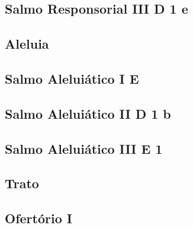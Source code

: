 \subsection[Salmo Responsorial III]{Salmo Responsorial III \textmd{D 1 e}}\label{subsection:liturgia-defunctorum/missa-pro-defunctis/psalmus-responsorius-3}

\subsection{Aleluia}\label{subsection:liturgia-defunctorum/missa-pro-defunctis/alleluia}
\def\AntiphonScore{alleluia.4E.2/}

\subsection[Salmo Aleluiático I]{Salmo Aleluiático I \textmd{E \protect\GreStar}}\label{subsection:liturgia-defunctorum/missa-pro-defunctis/psalmus-alleluiaticus-1}

\AllowPageFlush

\subsection[Salmo Aleluiático II]{Salmo Aleluiático II \textmd{D 1 b}}\label{subsection:liturgia-defunctorum/missa-pro-defunctis/psalmus-alleluiaticus-2}

\AllowPageFlush

\subsection[Salmo Aleluiático III]{Salmo Aleluiático III \textmd{E 1}}\label{subsection:liturgia-defunctorum/missa-pro-defunctis/psalmus-alleluiaticus-3}

\subsection{Trato}\label{subsection:liturgia-defunctorum/missa-pro-defunctis/tractus}

\subsection{Ofertório I}\label{subsection:liturgia-defunctorum/missa-pro-defunctis/offertorium-1}
\def\AntiphonScore{redemptor-meus-vivit.2D/}

